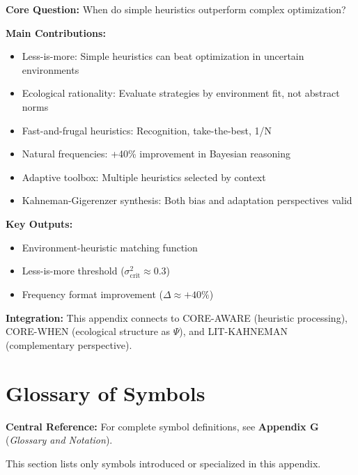 \begin{tcolorbox}[colback=green!10!white, colframe=green!75!black,
    title=\textbf{Appendix GI: Summary}]

\textbf{Core Question:} When do simple heuristics outperform complex optimization?

\textbf{Main Contributions:}
\begin{itemize}[nosep]
    \item Less-is-more: Simple heuristics can beat optimization in uncertain environments
    \item Ecological rationality: Evaluate strategies by environment fit, not abstract norms
    \item Fast-and-frugal heuristics: Recognition, take-the-best, 1/N
    \item Natural frequencies: +40\% improvement in Bayesian reasoning
    \item Adaptive toolbox: Multiple heuristics selected by context
    \item Kahneman-Gigerenzer synthesis: Both bias and adaptation perspectives valid
\end{itemize}

\textbf{Key Outputs:}
\begin{itemize}[nosep]
    \item Environment-heuristic matching function
    \item Less-is-more threshold ($\sigma^2_{\text{crit}} \approx 0.3$)
    \item Frequency format improvement ($\Delta \approx +40\%$)
\end{itemize}

\textbf{Integration:} This appendix connects to CORE-AWARE (heuristic processing),
CORE-WHEN (ecological structure as $\Psi$), and LIT-KAHNEMAN (complementary perspective).

\end{tcolorbox}


\section{Glossary of Symbols}
\label{sec:gi-glossary}

\begin{tcolorbox}[colback=blue!5!white, colframe=blue!75!black]
\textbf{Central Reference:} For complete symbol definitions, see
\textbf{Appendix G} (\textit{Glossary and Notation}).

This section lists only symbols introduced or specialized in this appendix.
\end{tcolorbox}

